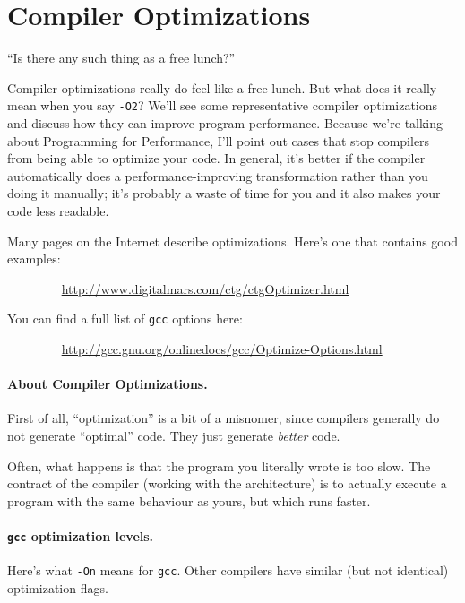 




\section*{Compiler Optimizations}

\hfill ``Is there any such thing as a free lunch?''

Compiler optimizations really do feel like a free lunch.
But what does it really mean when you say {\tt -O2}?
We'll see some representative compiler optimizations and discuss how
they can improve program performance. Because we're talking about
Programming for Performance, I'll point out cases that stop compilers
from being able to optimize your code. In general, it's better if the
compiler automatically does a performance-improving transformation
rather than you doing it manually; it's probably a waste of time for
you and it also makes your code less readable.

Many pages on the Internet describe
optimizations. Here's one that contains good examples:

$\qquad \qquad$ \url{http://www.digitalmars.com/ctg/ctgOptimizer.html}

You can find a full list of {\tt gcc} options here:

$\qquad \qquad$ \url{http://gcc.gnu.org/onlinedocs/gcc/Optimize-Options.html}

\paragraph{About Compiler Optimizations.} First of all, ``optimization'' is
a bit of a misnomer, since compilers generally do not generate ``optimal'' code.
They just generate \emph{better} code.

Often, what happens is that the program you literally wrote is too slow. The
contract of the compiler (working with the architecture) is to actually execute
a program with the same behaviour as yours, but which runs faster.

\paragraph{{\tt gcc} optimization levels.} Here's what {\tt -On} means for
{\tt gcc}. Other compilers have similar (but not identical) optimization flags.

